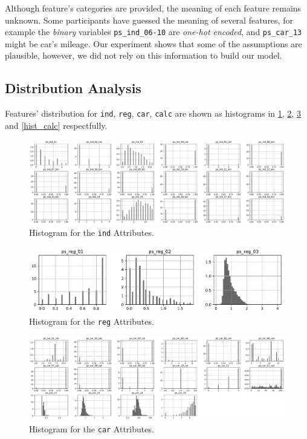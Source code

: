 \documentclass{standalone}
\begin{document}
Although feature's categories are provided, the meaning of each feature remains
unknown. Some participants have guessed the meaning of several features, for
example the \emph{binary} variables  \lstinline{ps_ind_06-10} are \emph{one-hot
encoded}, and \lstinline{ps_car_13} might be car's mileage. Our experiment
shows that some of the assumptions are plausible, however, we did not rely on
this information to build our model.

\subsection{Distribution Analysis}

Features' distribution for \lstinline{ind}, \lstinline{reg}, \lstinline{car},
\lstinline{calc} are shown as histograms in \cref{hist_ind}, \cref{hist_reg},
\cref{hist_car} and \cref{hist_calc} respectfully.

\begin{figure}[!htb]
\centering
\includegraphics[width=\textwidth]{fig/ind_col.pdf}
\caption{Histogram for the \lstinline{ind} Attributes.}
\label{hist_ind}
\end{figure}

\begin{figure}[!ht]
\centering
\includegraphics[width=.5\textwidth]{fig/reg_col.pdf}
\caption{Histogram for the \lstinline{reg} Attributes.}
\label{hist_reg}
\end{figure}

\begin{figure}[!ht]
\centering
\includegraphics[width=\textwidth]{fig/car_col.pdf}
\caption{Histogram for the \lstinline{car} Attributes.}
\label{hist_car}
\end{figure}
\end{document}
